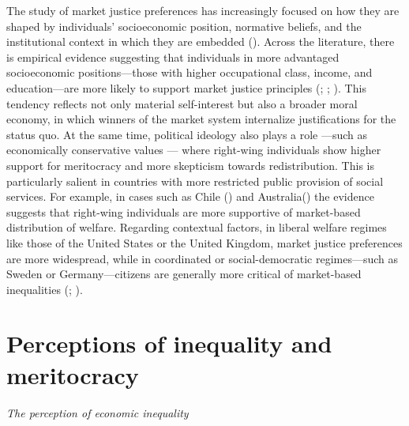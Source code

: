 \documentclass[
  12pt,
]{article}
\begin{document}
The study of market justice preferences has increasingly focused on how
they are shaped by individuals' socioeconomic position, normative
beliefs, and the institutional context in which they are embedded
(). Across the
literature, there is empirical evidence suggesting that individuals in
more advantaged socioeconomic positions---those with higher occupational
class, income, and education---are more likely to support market justice
principles (;
;
). This tendency
reflects not only material self-interest but also a broader moral
economy, in which winners of the market system internalize
justifications for the status quo. At the same time, political ideology
also plays a role ---such as economically conservative values --- where
right-wing individuals show higher support for meritocracy and more
skepticism towards redistribution. This is particularly salient in
countries with more restricted public provision of social services. For
example, in cases such as Chile
() and
Australia() the
evidence suggests that right-wing individuals are more supportive of
market-based distribution of welfare. Regarding contextual factors, in
liberal welfare regimes like those of the United States or the United
Kingdom, market justice preferences are more widespread, while in
coordinated or social-democratic regimes---such as Sweden or
Germany---citizens are generally more critical of market-based
inequalities (; ).

\section{Perceptions of inequality and
meritocracy}\label{perceptions-of-inequality-and-meritocracy}

\emph{The perception of economic inequality}
\end{document}
